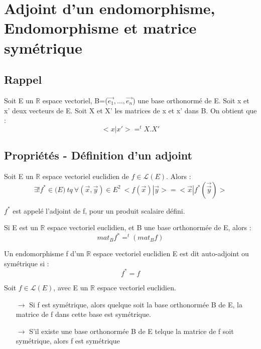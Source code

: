 \chapter{Adjoint d'un endomorphisme, Endomorphisme et matrice symétrique}
\section{Rappel}
Soit E un $\mathbb{R}$ espace vectoriel, B=($\overrightarrow{e_1},\dots,\overrightarrow{e_n}$) une base orthonormé de E. Soit x et x' deux vecteurs de E. Soit X et X' les matrices de x et x' dans B. On obtient que : 
$$<x|x'> = ^tX.X'$$
\section{Propriétés - Définition d'un adjoint}
\begin{prop}
Soit E un $\mathbb{R}$ espace vectoriel euclidien de $f \in \mathcal{L}(E)$. Alors :
$$\exists ! f^* \in \mathcal(E)~ tq~ \forall (\overrightarrow{x},\overrightarrow{y})\in E^2~ <f(\overrightarrow{x})|\overrightarrow{y}> = <\overrightarrow{x}|f^*(\overrightarrow{\overrightarrow{y}})>$$
\end{prop}
\begin{de}
$f^*$ est appelé l'adjoint de f, pour un produit scalaire défini.
\end{de}
\begin{prop}
Si E est un $\mathbb{R}$ espace vectoriel euclidien, et B une base orthonormée de E, alors : 
$$mat_B f^* = ^t(mat_B f)$$ 
\end{prop}
\begin{de}
Un endomorphisme f d'un $\mathbb{R}$ espace vectoriel euclidien E est dit auto-adjoint ou symétrique si :
$$f^* = f$$
\end{de}
\begin{prop}
Soit $f \in \mathcal{L}(E)$, avec E un $\mathbb{R}$ espace vectoriel euclidien.
\begin{itemize}
 \item[$\rightarrow$] Si f est symétrique, alors quelque soit la base orthonormée B de E, la matrice de f dans cette base est symétrique.
 \item[$\rightarrow$] S'il existe une base orthonormée B de E telque la matrice de f soit symétrique, alors f est symétrique
\end{itemize}
\end{prop}
